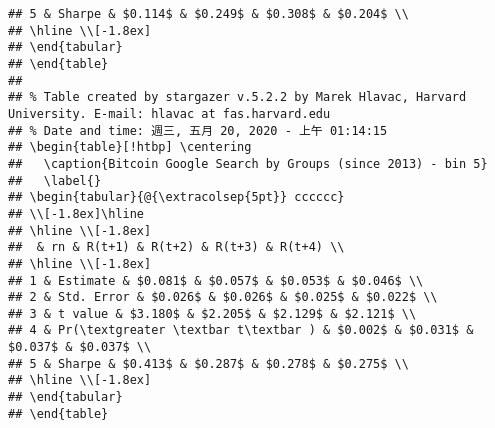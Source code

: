 \documentclass[
]{article}
\begin{document}
\begin{verbatim}
## 5 & Sharpe & $0.114$ & $0.249$ & $0.308$ & $0.204$ \\ 
## \hline \\[-1.8ex] 
## \end{tabular} 
## \end{table} 
## 
## % Table created by stargazer v.5.2.2 by Marek Hlavac, Harvard University. E-mail: hlavac at fas.harvard.edu
## % Date and time: 週三, 五月 20, 2020 - 上午 01:14:15
## \begin{table}[!htbp] \centering 
##   \caption{Bitcoin Google Search by Groups (since 2013) - bin 5} 
##   \label{} 
## \begin{tabular}{@{\extracolsep{5pt}} cccccc} 
## \\[-1.8ex]\hline 
## \hline \\[-1.8ex] 
##  & rn & R(t+1) & R(t+2) & R(t+3) & R(t+4) \\ 
## \hline \\[-1.8ex] 
## 1 & Estimate & $0.081$ & $0.057$ & $0.053$ & $0.046$ \\ 
## 2 & Std. Error & $0.026$ & $0.026$ & $0.025$ & $0.022$ \\ 
## 3 & t value & $3.180$ & $2.205$ & $2.129$ & $2.121$ \\ 
## 4 & Pr(\textgreater \textbar t\textbar ) & $0.002$ & $0.031$ & $0.037$ & $0.037$ \\ 
## 5 & Sharpe & $0.413$ & $0.287$ & $0.278$ & $0.275$ \\ 
## \hline \\[-1.8ex] 
## \end{tabular} 
## \end{table}
\end{verbatim}
\end{document}
